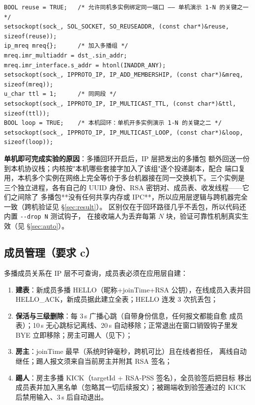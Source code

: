 \documentclass[11pt,a4paper,fontset=fandol]{ctexart}
\begin{document}
\begin{lstlisting}[caption={net/multicast.cpp：多播套接字关键配置},label={lst:mc}]
BOOL reuse = TRUE;   /* 允许同机多实例绑定同一端口 —— 单机演示 1-N 的关键之一 */
setsockopt(sock_, SOL_SOCKET, SO_REUSEADDR, (const char*)&reuse, sizeof(reuse));
ip_mreq mreq{};      /* 加入多播组 */
mreq.imr_multiaddr = dst_.sin_addr;
mreq.imr_interface.s_addr = htonl(INADDR_ANY);
setsockopt(sock_, IPPROTO_IP, IP_ADD_MEMBERSHIP, (const char*)&mreq, sizeof(mreq));
u_char ttl = 1;      /* 同网段 */
setsockopt(sock_, IPPROTO_IP, IP_MULTICAST_TTL, (const char*)&ttl, sizeof(ttl));
BOOL loop = TRUE;    /* 本机回环：单机开多实例演示 1-N 的关键之二 */
setsockopt(sock_, IPPROTO_IP, IP_MULTICAST_LOOP, (const char*)&loop, sizeof(loop));
\end{lstlisting}

\noindent \textbf{单机即可完成实验的原因}：多播回环开启后，IP 层把发出的多播包
额外回送一份到本机协议栈；内核按"本机哪些套接字加入了该组"逐个投递副本，配合
端口复用，本机多个实例在网络上完全等价于多台机器接在同一交换机下。三个实例是
三个独立进程，各有自己的 UUID 身份、RSA 密钥对、成员表、收发线程——它们之间除了
多播包**没有任何共享内存或 IPC**，所以应用层逻辑与跨机器完全一致（跨机验证见 \S\ref{sec:result}）。
区别仅在于回环路径几乎不丢包，所以代码还内置 \texttt{-{}-drop N} 测试钩子，
在接收端人为丢弃每第 $N$ 块，验证可靠性机制真实生效（见 \S\ref{sec:auto}）。

\subsection{成员管理（要求 c）}
\label{sec:member}

多播成员关系在 IP 层不可查询，成员表必须在应用层自建：

\begin{enumerate}[itemsep=1pt,topsep=2pt]
  \item \textbf{建表}：新成员多播 HELLO（昵称+joinTime+RSA 公钥），在线成员入表并回
        HELLO\_ACK，新成员据此建立全表；HELLO 连发 3 次抗丢包；
  \item \textbf{保活与三级删除}：每 3\,s 广播心跳（自带身份信息，任何报文都能自愈
        成员表）；10\,s 无心跳标记离线、20\,s 自动移除；正常退出在窗口销毁钩子里发
        BYE 立即移除；房主可踢人（见下）；
  \item \textbf{房主}：joinTime 最早（系统时钟毫秒，跨机可比）且在线者担任，
        离线自动继任；踢人报文须来自当前房主并附其 RSA 签名；
  \item \textbf{踢人}：房主多播 KICK（targetId + RSA-PSS 签名），全员验签后把目标
        移出成员表并加入黑名单（忽略其一切后续报文）；被踢端收到验签通过的 KICK
        后禁用输入、3\,s 后自动退出。
\end{enumerate}
\end{document}
